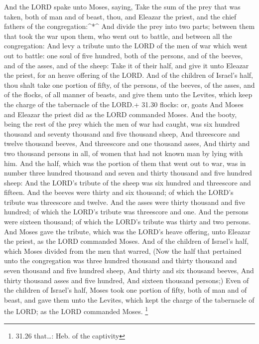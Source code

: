  And the LORD spake unto Moses, saying,  Take
the sum of the prey that was taken, both of man and of beast, thou, and
Eleazar the priest, and the chief fathers of the congregation:\^{}*\^{}
 And divide the prey into two parts; between them that took
the war upon them, who went out to battle, and between all the
congregation:  And levy a tribute unto the LORD of the men
of war which went out to battle: one soul of five hundred, both of the
persons, and of the beeves, and of the asses, and of the sheep:
 Take it of their half, and give it unto Eleazar the
priest, for an heave offering of the LORD.  And of the
children of Israel's half, thou shalt take one portion of fifty, of the
persons, of the beeves, of the asses, and of the flocks, of all manner
of beasts, and give them unto the Levites, which keep the charge of the
tabernacle of the LORD.+ 31.30 flocks: or, goats  And Moses
and Eleazar the priest did as the LORD commanded Moses. 
And the booty, being the rest of the prey which the men of war had
caught, was six hundred thousand and seventy thousand and five thousand
sheep,  And threescore and twelve thousand beeves,
 And threescore and one thousand asses,  And
thirty and two thousand persons in all, of women that had not known man
by lying with him.  And the half, which was the portion of
them that went out to war, was in number three hundred thousand and
seven and thirty thousand and five hundred sheep:  And the
LORD's tribute of the sheep was six hundred and threescore and fifteen.
 And the beeves were thirty and six thousand; of which the
LORD's tribute was threescore and twelve.  And the asses
were thirty thousand and five hundred; of which the LORD's tribute was
threescore and one.  And the persons were sixteen thousand;
of which the LORD's tribute was thirty and two persons. 
And Moses gave the tribute, which was the LORD's heave offering, unto
Eleazar the priest, as the LORD commanded Moses.  And of
the children of Israel's half, which Moses divided from the men that
warred,  (Now the half that pertained unto the congregation
was three hundred thousand and thirty thousand and seven thousand and
five hundred sheep,  And thirty and six thousand beeves,
 And thirty thousand asses and five hundred, 
And sixteen thousand persons;)  Even of the children of
Israel's half, Moses took one portion of fifty, both of man and of
beast, and gave them unto the Levites, which kept the charge of the
tabernacle of the LORD; as the LORD commanded Moses. \footnote{31.26
  that\ldots: Heb. of the captivity}

